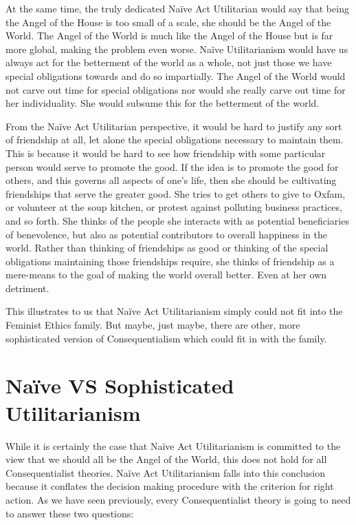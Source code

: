 At the same time,  the truly dedicated Naïve Act Utilitarian would say that being the Angel of the House is too small of a scale, she should be the Angel of the World. The Angel of the World is much like the Angel of the House but is far more global, making the problem even worse. Naïve Utilitarianism would have us always act for the betterment of the world as a whole, not just those we have special obligations towards and do so impartially. The Angel of the World would not carve out time for special obligations nor would she really carve out time for her individuality. She would subsume this for the betterment of the world.

From the Naïve Act Utilitarian perspective, it would be hard to justify any sort of friendship at all, let alone the special obligations necessary to maintain them. This is because it would be hard to see how friendship with some particular person would serve to promote the good. If the idea is to promote the good for others, and this governs all aspects of one's life, then she should be cultivating friendships that serve the greater good. She tries to get others to give to Oxfam, or volunteer at the soup kitchen, or protest against polluting business practices, and so forth. She thinks of the people she interacts with as potential beneficiaries of benevolence, but also as potential contributors to overall happiness in the world. Rather than thinking of friendships as good or thinking of the special obligations maintaining those friendships require, she thinks of friendship as a mere-means to the goal of making the world overall better. Even at her own detriment.

This illustrates to us that  Naïve Act Utilitarianism simply could not fit into the Feminist Ethics family. But maybe, just maybe, there are other, more sophisticated version of Consequentialism which could fit in with the family. 

\section{Naïve VS Sophisticated Utilitarianism}

While it is certainly the case that  Naïve Act Utilitarianism is committed to the view that we should all be the Angel of the World, this does not hold for all Consequentialist theories.  Naïve Act Utilitarianism falls into this conclusion because it conflates the decision making procedure with the criterion for right action. As we have seen previously, every Consequentialist theory is going to need to answer these two questions: 

